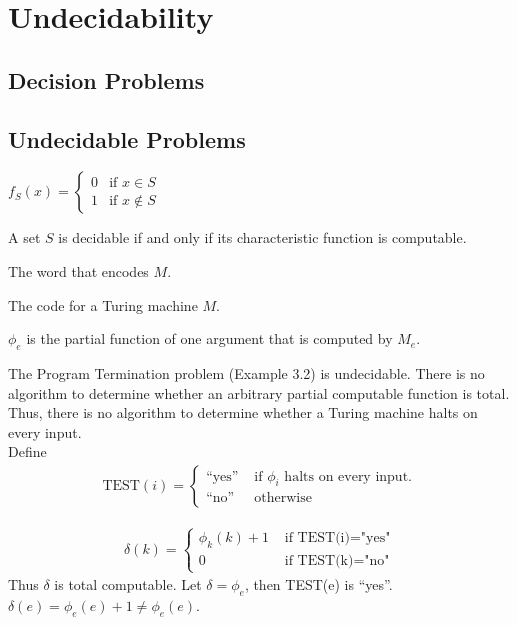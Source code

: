 \section{Undecidability}

\subsection{Decision Problems}

\subsection{Undecidable Problems}

$f_{S}(x) = \begin{cases}
  0 & \text{if } x \in S \\ 
  1 & \text{if } x \notin S
\end{cases}$

 A set $S$ is decidable if and only if its characteristic
function is computable.

 The word that encodes $M$.

 The code for a Turing machine $M$.

 $\phi_e$ is the partial function of one
argument that is computed by $M_e$.

 The Program Termination problem (Example 3.2) is undecidable.
There is no algorithm to determine whether an arbitrary partial computable
function is total. Thus, there is no algorithm to determine whether a Turing
machine
halts on every input.\\
Define
\begin{align*}
  \text{TEST}(i) = 
  \begin{cases}
    \text{``yes''} & \text{ if } \phi_i \text{ halts on every input.} \\
    \text{``no''} & \text{ otherwise}
  \end{cases}
\end{align*}

\begin{align*}
  \delta(k) =
  \begin{cases}
    \phi_k(k)+1 & \text{ if TEST(i)="yes"} \\
    0 & \text{ if TEST(k)="no"}
  \end{cases}
\end{align*}
Thus $\delta$ is total computable. Let $\delta=\phi_e$, then TEST(e) is ``yes''.
$\delta(e)=\phi_e(e)+1 \neq \phi_e(e)$.


